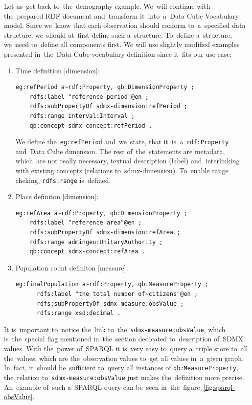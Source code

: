 Let us~get back to~the~demography example. We~will continue with the~prepared RDF
document and~transform it~into~a~Data Cube Vocabulary model. Since we~know that each
observation should conform to~a~specified data structure, we~should at~first define
such a~structure. To~define a~structure, we~need to~define all components first.
We will use slightly modified examples presented in~the~Data Cube vocabulary
definition since it~fits our use case:

\begin{enumerate}
\item Time definition [dimension]:

\begin{verbatim}
eg:refPeriod a~rdf:Property, qb:DimensionProperty ;
    rdfs:label "reference period"@en ;
    rdfs:subPropertyOf sdmx-dimension:refPeriod ;
    rdfs:range interval:Interval ;
    qb:concept sdmx-concept:refPeriod .
\end{verbatim}

We define the~\texttt{eg:refPeriod} and~we~state, that it~is~a~\texttt{rdf:Property} and~Data Cube dimension.
The rest of~the~statements are metadata, which~are not really necessary, textual description
(label) and~interlinking with existing concepts (relations to~sdmx-dimension). To~enable range
cheking, \texttt{rdfs:range} is~defined.

\item Place definiton [dimension]:

\begin{verbatim}
eg:refArea a~rdf:Property, qb:DimensionProperty ;
    rdfs:label "reference area"@en ;
    rdfs:subPropertyOf sdmx-dimension:refArea ;
    rdfs:range admingeo:UnitaryAuthority ;
    qb:concept sdmx-concept:refArea .
\end{verbatim}

\item Population count definiton [measure]:
\begin{verbatim}
eg:finalPopulation a~rdf:Property, qb:MeasureProperty ;
      rdfs:label "the total number of~citizens"@en ;
      rdfs:subPropertyOf sdmx-measure:obsValue ;
      rdfs:range xsd:decimal .
\end{verbatim}
\end{enumerate}

It is~important to~notice the~link to~the~\texttt{sdmx-measure:obsValue}, which is~the~special flag
mentioned in~the~section dedicated to~description of~SDMX values. With the~power of~SPARQL
it is~very easy to~query a~triple store to~all the~values, which are the~observation values to~get
all values in~a~given graph. In~fact, it~should be~sufficient to~query all instances of
\texttt{qb:MeasureProperty}, the~relation to~\texttt{sdmx-measure:obsValue} just makes the~definition
more precise. An~example of~such a~SPARQL query can be~seen in~the~figure~\ref{fig:sparql-obsValue}.

